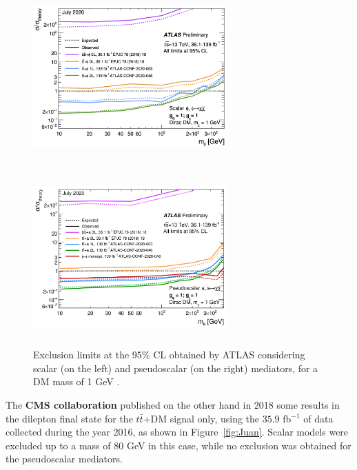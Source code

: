 \documentclass[a4paper, 10pt, openright]{report}
\begin{document}
\begin{figure}[htbp]
\centering
\begin{minipage}[b]{.4\textwidth}
\includegraphics[width=7.5cm, height=6.8cm]{figs/ATLASttDM_scalar.png}
\end{minipage}\hfill
\begin{minipage}[b]{.48\textwidth}
\includegraphics[width=7.5cm, height=6.8cm]{figs/ATLASttDM_pseudoscalar.png}
\end{minipage}\hfill
\caption{Exclusion limits at the 95\% \ac{CL} obtained by \ac{ATLAS} considering  scalar (on the left) and pseudoscalar (on the right) mediators, for a \ac{DM} mass of 1 GeV \cite{ATLASICHEP2020}.}
\label{fig:ATLASICHEP2}
\end{figure}

The \textbf{\ac{CMS} collaboration} published on the other hand in 2018 some results in the dilepton final state for the $t \bar t$+DM signal only, using the $35.9$ fb$^{-1}$ of data collected during the year 2016, as shown in Figure~\ref{fig:Juan}. Scalar models were excluded up to a mass of 80 GeV in this case, while no exclusion was obtained for the pseudoscalar mediators.
\end{document}
